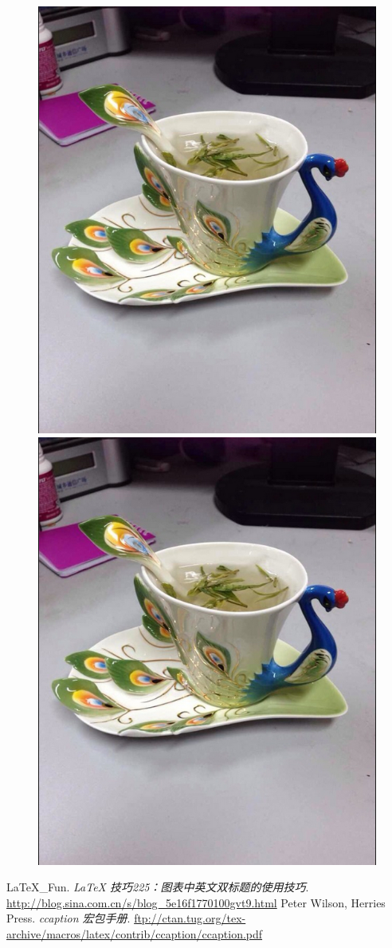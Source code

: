 \documentclass{article}
\begin{document}
\begin{figure}[htbp]
\begin{minipage}{.5\linewidth}
  \centering
  \includegraphics[width=.5\linewidth]{p1}
\end{minipage}%
\begin{minipage}{.5\linewidth}
  \renewcommand{\figurename}{Fig}
  \centering
  \includegraphics[width=.5\linewidth]{p1}
\end{minipage}
\end{figure}

\nocite{*}
\begin{thebibliography}{99}
	 \LaTeX\_Fun. \emph{\LaTeX{} 技巧225：图表中英文双标题的使用技巧}.  \url{http://blog.sina.com.cn/s/blog_5e16f1770100gvt9.html}
	 Peter Wilson, Herries Press. \emph{ccaption 宏包手册}.  \url{ftp://ctan.tug.org/tex-archive/macros/latex/contrib/ccaption/ccaption.pdf}
\end{thebibliography}
\end{document}
